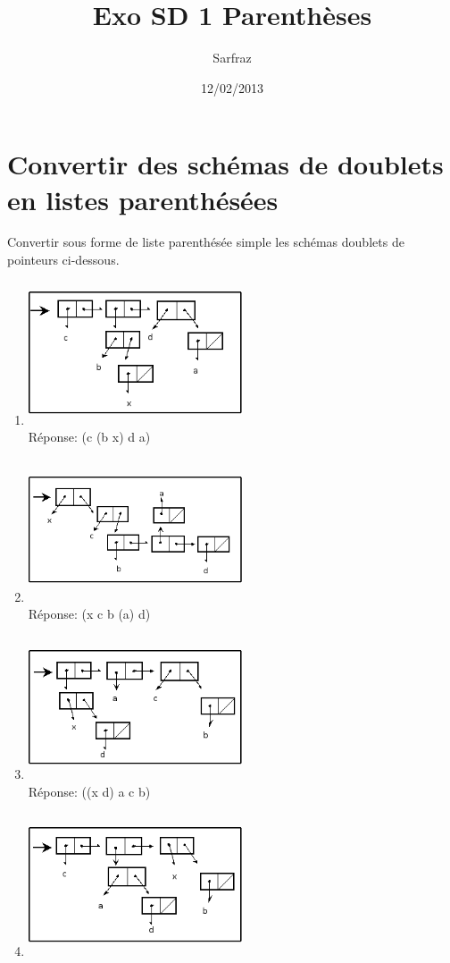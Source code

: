\documentclass[a4paper, 11pt]{article}
\title{Exo SD 1 Parenthèses}
\author{Sarfraz \bsc{Kapasi}}
\date{12/02/2013}
\begin{document}
%
\maketitle
%
\section{Convertir des schémas de doublets en listes parenthésées}

Convertir sous forme de liste parenthésée simple les schémas doublets de pointeurs ci-dessous.\\

\begin{enumerate}
  \item \includegraphics[height=120pt, width=180pt]{Pointeurs_Exo1.png}\\
Réponse: (c (b x) d a)
  \item \includegraphics[height=120pt, width=180pt]{Pointeurs_Exo2.png}\\
Réponse: (x c b (a) d)
  \item \includegraphics[height=120pt, width=180pt]{Pointeurs_Exo3.png}\\
Réponse: ((x d) a c b)
  \item \includegraphics[height=120pt, width=180pt]{Pointeurs_Exo4.png}\\

\end{enumerate}
\end{document}
